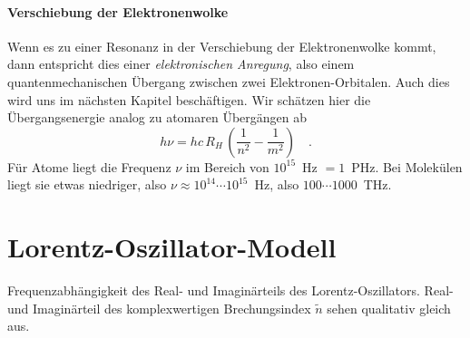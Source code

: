 \paragraph{Verschiebung der Elektronenwolke} Wenn es zu einer Resonanz in der Verschiebung der Elektronenwolke kommt, dann entspricht dies einer \emph{elektronischen Anregung}, also einem quantenmechanischen Übergang zwischen zwei Elektronen-Orbitalen. Auch dies wird uns  im nächsten Kapitel beschäftigen. Wir schätzen hier die Übergangsenergie analog zu atomaren Übergängen ab
\begin{equation}
  h \nu = hc \, R_H \, \left( \frac{1}{n^2} - \frac{1}{m^2} \right) \quad .
\end{equation}
Für Atome liegt die Frequenz $\nu$ im Bereich von $10^{15}$~Hz $= 1$~PHz. Bei Molekülen liegt sie etwas niedriger, also $\nu \approx 10^{14} \cdots 10^{15}$~Hz, also $100 \cdots 1000$~THz.


\section{Lorentz-Oszillator-Modell}


\begin{marginfigure}

\caption{Frequenzabhängigkeit des Real- und Imaginärteils des Lorentz-Oszillators. Real- und  Imaginärteil des komplexwertigen Brechungsindex $\tilde{n}$ sehen qualitativ gleich aus. \label{fig:diel_lorentz}}
\end{marginfigure}


